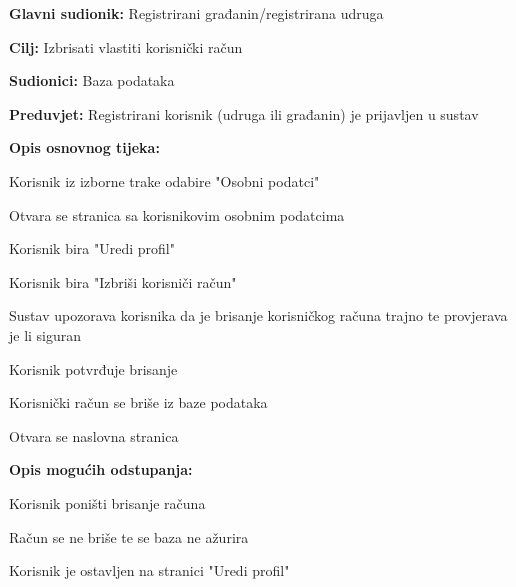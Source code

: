 		
				\noindent {}
			\begin{packed_item}
				
				\item \textbf{Glavni sudionik:} Registrirani građanin/registrirana udruga
				\item  \textbf{Cilj:} Izbrisati vlastiti korisnički račun
				\item  \textbf{Sudionici:} Baza podataka
				\item  \textbf{Preduvjet:} Registrirani korisnik (udruga ili građanin) je prijavljen u sustav
				\item  \textbf{Opis osnovnog tijeka:}
				
				\item[] \begin{packed_enum}	
					\item Korisnik iz izborne trake odabire "Osobni podatci"
					\item Otvara se stranica sa korisnikovim osobnim podatcima
					\item Korisnik bira "Uredi profil"
					\item Korisnik bira "Izbriši korisniči račun"
					\item Sustav upozorava korisnika da je brisanje korisničkog računa trajno te provjerava je li siguran
					\item Korisnik potvrđuje brisanje
					\item Korisnički račun se briše iz baze podataka
					\item Otvara se naslovna stranica
				\end{packed_enum}
				\item  \textbf{Opis mogućih odstupanja:}
				
				\item[] \begin{packed_item}
					
					\item [5.a]  Korisnik poništi brisanje računa
					\item[] \begin{packed_enum}
						\item Račun se ne briše te se baza ne ažurira
						\item Korisnik je ostavljen na stranici "Uredi profil"
					\end{packed_enum}
				\end{packed_item}
			\end{packed_item}
		
